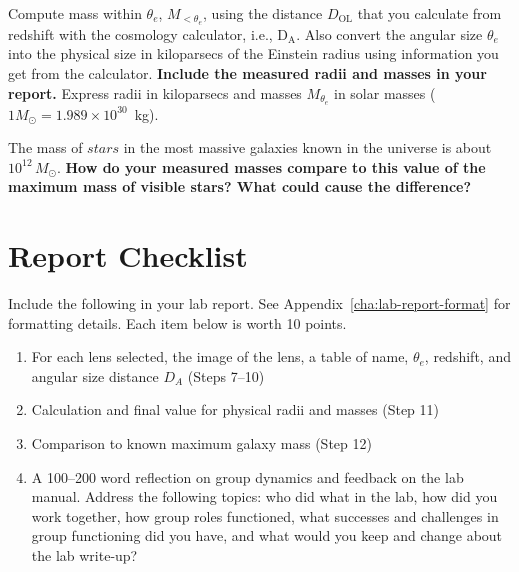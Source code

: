 \begin{steps}
	\item Compute mass within $\theta_e$, $M_{<\theta_e}$, using the distance $D_\textrm{OL}$
	that you calculate from redshift with the cosmology calculator,
	i.e., D$_\textrm{A}$. Also convert the angular size $\theta_e$ into the physical
	size in kiloparsecs of the Einstein radius using information you get from the
	calculator. \textbf{Include the measured radii and masses in your
	report.} Express radii in kiloparsecs and masses $M_{\theta_e}$ in
	solar masses ($1M_{\odot}=1.989\times 10^{30}$~kg).
	
	\item The mass of $stars$ in the most massive galaxies known in the
	universe is about $10^{12}\,M_{\odot}$. \textbf{How do your measured masses
	compare to this value of the maximum mass of visible stars? What
	could cause the difference?}
	
\end{steps}

%

\section{Report Checklist}

Include the following in your lab report. See Appendix~\ref{cha:lab-report-format} for formatting details. Each item below is worth 10 points.

\begin{enumerate}
	\item For each lens selected, the image of the lens, a table of name, $\theta_e$, redshift, and angular size distance $D_A$ (Steps 7--10)
	\item Calculation and final value for physical radii and masses (Step 11)
	\item Comparison to known maximum galaxy mass (Step 12)
	\item A 100--200 word reflection on group dynamics and feedback on the lab manual. Address the following topics: who did what in the lab, how did you work together, how group roles functioned, what successes and challenges in group functioning did you have, and what would you keep and change about the lab write-up?
\end{enumerate}
